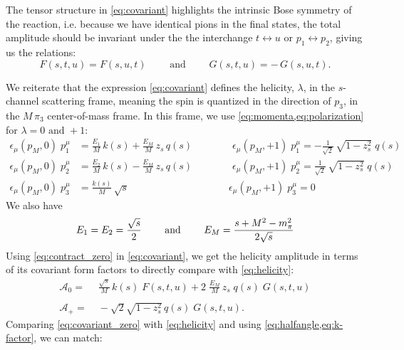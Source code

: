  The  tensor structure in \cref{eq:covariant} highlights the intrinsic Bose symmetry of the reaction, i.e. because we have identical pions in the final states, the total amplitude should be invariant under the the interchange \(t \leftrightarrow u \) or \(p_1 \leftrightarrow p_2\), giving us the relations:
   \begin{equation}
     F(s,t,u) = F(s,u,t) \qquad \text{ and } \qquad G(s,t,u) = - \, G(s,u,t).
   \end{equation}

 We reiterate that the expression \cref{eq:covariant} defines the helicity, \(\lambda\), in the \(s\)-channel scattering frame, meaning the spin is quantized in the direction of \(p_3\), in the \(M \, \pi_3\) center-of-mass frame.
 In this frame, we use \cref{eq:momenta,eq:polarization} for \(\lambda = 0 \text{ and } +1 \):
   \begin{align}
     \label{eq:contract_zero}
     \epsilon_\mu(p_M,0) \; p_1^\mu &= \frac{E_1}{M} \, k(s) + \frac{E_M}{M} \,  z_s \, q(s)
     \qquad \qquad \epsilon_\mu(p_M,+1) \; p_1^\mu = - \frac{1}{\sqrt{2}} \, \sqrt{1 - z_s^2} \; q(s) \nonumber \\
     \epsilon_\mu(p_M,0) \; p_2^\mu &= \frac{E_2}{M} \, k(s) - \frac{E_M}{M} \,  z_s \, q(s)
     \qquad \qquad
      \epsilon_\mu(p_M,+1) \; p_2^\mu =  \frac{1}{\sqrt{2}} \, \sqrt{1 - z_s^2} \; q(s)  \\
     \epsilon_\mu(p_M,0) \; p_3^\mu &= \frac{k(s)}{M} \, \sqrt{s}
      \qquad \qquad \qquad \qquad \qquad 
      \epsilon_\mu(p_M,+1) \; p_3^\mu = 0 \nonumber
   \end{align}
 We also have
   \begin{equation}
     \label{eq:energies}
     E_1 = E_2 = \frac{\sqrt{s}}{2} \qquad \text{ and } \qquad E_M = \frac{s + M^2 - m_\pi^2}{2 \sqrt{s}}
   \end{equation}
 Using \cref{eq:contract_zero} in \cref{eq:covariant}, we get the helicity amplitude in terms of its covariant form factors to directly compare with \cref{eq:helicity}:
  \begin{align}
   \label{eq:covariant_zero}
    \mathcal{A}_0 =& \; \frac{\sqrt{s}}{M} \, k(s) \; F(s,t,u) + 2 \; \frac{E_M}{M} \, z_s \; q(s) \; G(s,t,u) \\
    \nonumber \\
    \label{eq:covariant_plus}
    \mathcal{A}_+ =& \; - \sqrt{2} \sqrt{1-z_s^2} \, q(s) \; G(s,t,u).
  \end{align}
 Comparing \cref{eq:covariant_zero} with \cref{eq:helicity} and using \cref{eq:halfangle,eq:k-factor}, we can match:
